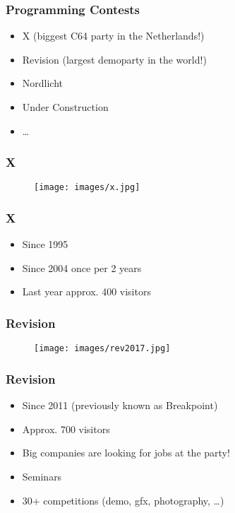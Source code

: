 \documentclass[aspectratio=43]{uva-inf-presentation}
\begin{document}
\begin{frame}
\frametitle{Programming Contests}

\begin{itemize}
\item X (biggest C64 party in the Netherlands!)
\item Revision (largest demoparty in the world!)
\item Nordlicht
\item Under Construction
\item \dots
\end{itemize}

\end{frame}


\begin{frame}
\frametitle{X}

\begin{figure}
\texttt{[image: images/x.jpg]}
\end{figure}

\end{frame}


\begin{frame}[noframenumbering]
\frametitle{X}

\begin{itemize}
\item Since 1995
\item Since 2004 once per 2 years
\item Last year approx. 400 visitors
\end{itemize}

\end{frame}


\begin{frame}
\frametitle{Revision}

\begin{figure}
\texttt{[image: images/rev2017.jpg]}
\end{figure}

\end{frame}


\begin{frame}[noframenumbering]
\frametitle{Revision}

\begin{itemize}
\item Since 2011 (previously known as Breakpoint)
\item Approx. 700 visitors
\item Big companies are looking for jobs at the party!
\item Seminars
\item 30+ competitions (demo, gfx, photography, \dots)
\end{itemize}

\end{frame}
\end{document}
